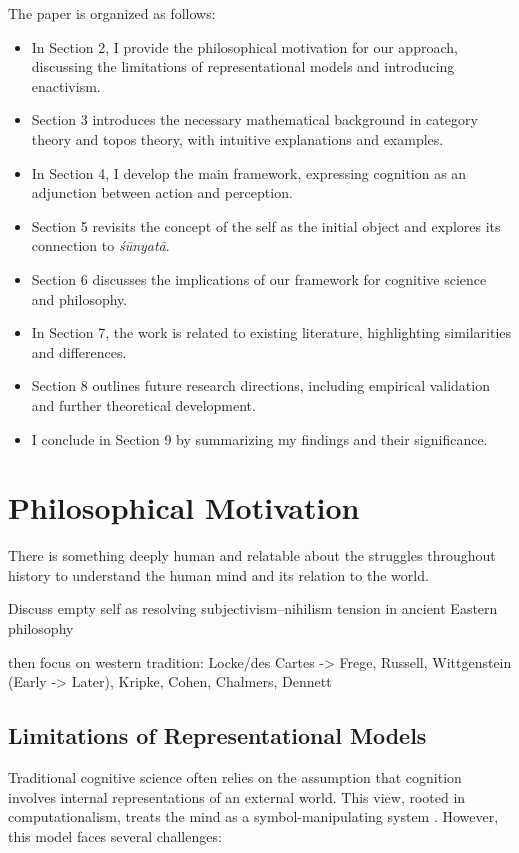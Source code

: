 \documentclass{article}
\begin{document}
The paper is organized as follows:

\begin{itemize}
    \item In Section 2, I provide the philosophical motivation for our approach, discussing the limitations of representational models and introducing enactivism.
    \item Section 3 introduces the necessary mathematical background in category theory and topos theory, with intuitive explanations and examples.
    \item In Section 4, I develop the main framework, expressing cognition as an adjunction between action and perception.
    \item Section 5 revisits the concept of the self as the initial object and explores its connection to \emph{śūnyatā}.
    \item Section 6 discusses the implications of our framework for cognitive science and philosophy.
    \item In Section 7, the work is related to existing literature, highlighting similarities and differences.
    \item Section 8 outlines future research directions, including empirical validation and further theoretical development.
    \item I conclude in Section 9 by summarizing my findings and their significance.
\end{itemize}


\section{Philosophical Motivation}
There is something deeply human and relatable about the struggles throughout history to understand the human mind and its relation to the world.

Discuss empty self as resolving subjectivism--nihilism tension in ancient Eastern philosophy

then focus on western tradition: Locke/des Cartes -> Frege, Russell, Wittgenstein (Early -> Later), Kripke, Cohen, Chalmers, Dennett


\subsection{Limitations of Representational Models}
Traditional cognitive science often relies on the assumption that cognition involves internal representations of an external world. This view, rooted in computationalism, treats the mind as a symbol-manipulating system \cite{fodor1980}. However, this model faces several challenges:
\end{document}
